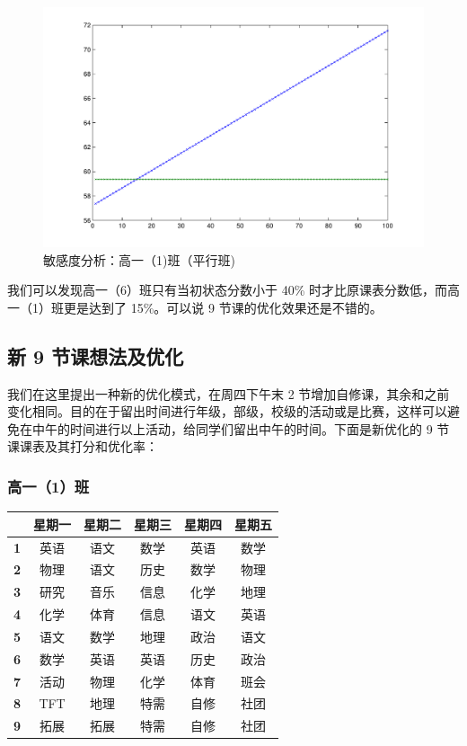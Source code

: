 \documentclass[a4paper]{article}
\begin{document}
  \begin{figure}[H]
  \centerline{\includegraphics[scale=0.5]{sennorm.pdf}}
  \caption{敏感度分析：高一（1)班（平行班)}
  \end{figure}

  我们可以发现高一（6）班只有当初状态分数小于 40\% 时才比原课表分数低，而高一（1）班更是达到了 15\%。可以说 9 节课的优化效果还是不错的。

 \clearpage

 \subsection{新 9 节课想法及优化}

  我们在这里提出一种新的优化模式，在周四下午末 2 节增加自修课，其余和之前变化相同。目的在于留出时间进行年级，部级，校级的活动或是比赛，这样可以避免在中午的时间进行以上活动，给同学们留出中午的时间。下面是新优化的 9 节课课表及其打分和优化率：

  \subsubsection{高一（1）班}

   \begin{tabular}{cccccc}
   \toprule
   & \bf 星期一 & \bf 星期二 & \bf 星期三 & \bf 星期四 & \bf 星期五 \\
   \midrule
   \bf 1 & 英语 & 语文 & 数学 & 英语 & 数学 \\
   \bf 2 & 物理 & 语文 & 历史 & 数学 & 物理 \\
   \bf 3 & 研究 & 音乐 & 信息 & 化学 & 地理 \\
   \bf 4 & 化学 & 体育 & 信息 & 语文 & 英语 \\
   \bf 5 & 语文 & 数学 & 地理 & 政治 & 语文 \\
   \midrule
   \bf 6 & 数学 & 英语 & 英语 & 历史 & 政治 \\
   \bf 7 & 活动 & 物理 & 化学 & 体育 & 班会 \\
   \bf 8 & TFT  & 地理 & 特需 & 自修 & 社团 \\
   \bf 9 & 拓展 & 拓展 & 特需 & 自修 & 社团 \\
   \bottomrule
   \end{tabular}
\end{document}
